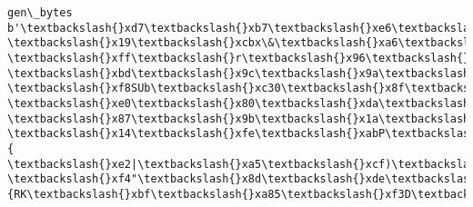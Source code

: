 \documentclass[11pt]{article}
\begin{document}
    \begin{Verbatim}[commandchars=\\\{\}]
gen\_bytes
b'\textbackslash{}xd7\textbackslash{}xb7\textbackslash{}xe6\textbackslash{}x9a(i\textbackslash{}xac\textbackslash{}x18\textbackslash{}xd9\textbackslash{}x7f-\textbackslash{}x19\textbackslash{}xcbx\&\textbackslash{}xa6\textbackslash{}t\textbackslash{}xccu\textbackslash{}xc7\textbackslash{}x8f\textbackslash{}xa4p\textbackslash{}x96
\textbackslash{}xff\textbackslash{}r\textbackslash{}x96\textbackslash{}xdaM\textbackslash{}xce\textbackslash{}x13\textbackslash{}x91\textbackslash{}x88\textbackslash{}xb6\textbackslash{}x8e\textbackslash{}xa6\textbackslash{}xec-\textbackslash{}xbd\textbackslash{}x9c\textbackslash{}x9a\textbackslash{}x9f\textbackslash{}xb0o
\textbackslash{}xf8SUb\textbackslash{}xc30\textbackslash{}x8f\textbackslash{}x98j"Sx\textbackslash{}xc4\textbackslash{}x9c\textbackslash{}xae\$\textbackslash{}xe6\textbackslash{}x08\textbackslash{}x9cl\textbackslash{}x17\textbackslash{}xa8\textbackslash{}xe2\textbackslash{}xb6D\textbackslash{}xd4\textbackslash{}x06
\textbackslash{}xe0\textbackslash{}x80\textbackslash{}xda\textbackslash{}xb0\textbackslash{}x18\textbackslash{}xee\textbackslash{}xac\textbackslash{}xa6b\textbackslash{}xaa\textbackslash{}xe5\textbackslash{}xe0\textbackslash{}xa9\textbackslash{}x91\$\&s0\textbackslash{}'U\textbackslash{}xae\textbackslash{}xa1\textbackslash{}x92y
\textbackslash{}x87\textbackslash{}x9b\textbackslash{}x1a\textbackslash{}x9a\$\textbackslash{}xaf\textbackslash{}xa2\}\textbackslash{}xb9\textbackslash{}xa9\textbackslash{}xa3k;\textbackslash{}xa9\textbackslash{}xc5\textbackslash{}x8cU\textbackslash{}xce\textbackslash{}xcd0\textbackslash{}x12\textbackslash{}xa3v
\textbackslash{}x14\textbackslash{}xfe\textbackslash{}xabP\textbackslash{}xa0\textbackslash{}xca\textbackslash{}x9c\textbackslash{}xb4\textbackslash{}x98c\textbackslash{}xdd\textbackslash{}x80\textbackslash{}xc5\textbackslash{}xf6\textbackslash{}x1a\textbackslash{}x87o\textbackslash{}x8a\textbackslash{}xeb3V\{
\textbackslash{}xe2|\textbackslash{}xa5\textbackslash{}xcf)\textbackslash{}x81x\textbackslash{}x1a\textbackslash{}xd79b|\textbackslash{}xe3\textbackslash{}xa7k\textbackslash{}x82\textbackslash{}x83\textbackslash{}xf9\textbackslash{}xdc(I\textbackslash{}xd44@\textbackslash{}xa6J\textbackslash{}xc1
\textbackslash{}xf4"\textbackslash{}x8d\textbackslash{}xde\textbackslash{}xb1\textbackslash{}xd0e\textbackslash{}x98k\textbackslash{}xb4\textbackslash{}xb3\{RK\textbackslash{}xbf\textbackslash{}xa85\textbackslash{}xf3D\textbackslash{}xd2\textbackslash{}x1c!\textbackslash{}xb7\textbackslash{}xcf

\end{Verbatim}
\end{document}
